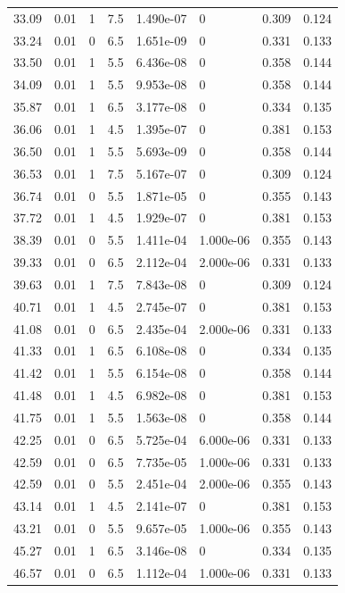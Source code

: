 \documentclass[preview]{standalone}
\begin{document}
{{{\begin{tabular}{L{1.2cm}C{1.2cm} C{0.3cm}C{0.5cm} C{1.4cm}C{1.4cm} C{1.4cm}C{1.4cm}}
  33.09  &  0.01  & 1     & 7.5 &  1.490e-07  & 0  & 0.309 &  0.124   \\ 
  33.24  &  0.01  & 0     & 6.5 &  1.651e-09  & 0  & 0.331 &  0.133   \\ 
  33.50  &  0.01  & 1     & 5.5 &  6.436e-08  & 0  & 0.358 &  0.144   \\ 
  34.09  &  0.01  & 1     & 5.5 &  9.953e-08  & 0  & 0.358 &  0.144   \\ 
  35.87  &  0.01  & 1     & 6.5 &  3.177e-08  & 0  & 0.334 &  0.135   \\ 
  36.06  &  0.01  & 1     & 4.5 &  1.395e-07  & 0  & 0.381 &  0.153   \\ 
  36.50  &  0.01  & 1     & 5.5 &  5.693e-09  & 0  & 0.358 &  0.144   \\ 
  36.53  &  0.01  & 1     & 7.5 &  5.167e-07  & 0  & 0.309 &  0.124   \\ 
  36.74  &  0.01  & 0     & 5.5 &  1.871e-05  & 0  & 0.355 &  0.143   \\ 
  37.72  &  0.01  & 1     & 4.5 &  1.929e-07  & 0  & 0.381 &  0.153   \\ 
  38.39  &  0.01  & 0     & 5.5 &  1.411e-04  & 1.000e-06  & 0.355 &  0.143   \\ 
  39.33  &  0.01  & 0     & 6.5 &  2.112e-04  & 2.000e-06  & 0.331 &  0.133   \\ 
  39.63  &  0.01  & 1     & 7.5 &  7.843e-08  & 0  & 0.309 &  0.124   \\ 
  40.71  &  0.01  & 1     & 4.5 &  2.745e-07  & 0  & 0.381 &  0.153   \\ 
  41.08  &  0.01  & 0     & 6.5 &  2.435e-04  & 2.000e-06  & 0.331 &  0.133   \\ 
  41.33  &  0.01  & 1     & 6.5 &  6.108e-08  & 0  & 0.334 &  0.135   \\ 
  41.42  &  0.01  & 1     & 5.5 &  6.154e-08  & 0  & 0.358 &  0.144   \\ 
  41.48  &  0.01  & 1     & 4.5 &  6.982e-08  & 0  & 0.381 &  0.153   \\ 
  41.75  &  0.01  & 1     & 5.5 &  1.563e-08  & 0  & 0.358 &  0.144   \\ 
  42.25  &  0.01  & 0     & 6.5 &  5.725e-04  & 6.000e-06  & 0.331 &  0.133   \\ 
  42.59  &  0.01  & 0     & 6.5 &  7.735e-05  & 1.000e-06  & 0.331 &  0.133   \\ 
  42.59  &  0.01  & 0     & 5.5 &  2.451e-04  & 2.000e-06  & 0.355 &  0.143   \\ 
  43.14  &  0.01  & 1     & 4.5 &  2.141e-07  & 0  & 0.381 &  0.153   \\ 
  43.21  &  0.01  & 0     & 5.5 &  9.657e-05  & 1.000e-06  & 0.355 &  0.143   \\ 
  45.27  &  0.01  & 1     & 6.5 &  3.146e-08  & 0  & 0.334 &  0.135   \\ 
  46.57  &  0.01  & 0     & 6.5 &  1.112e-04  & 1.000e-06  & 0.331 &  0.133   \\ 
\hline 
\end{tabular} 

}}}
\end{document}
